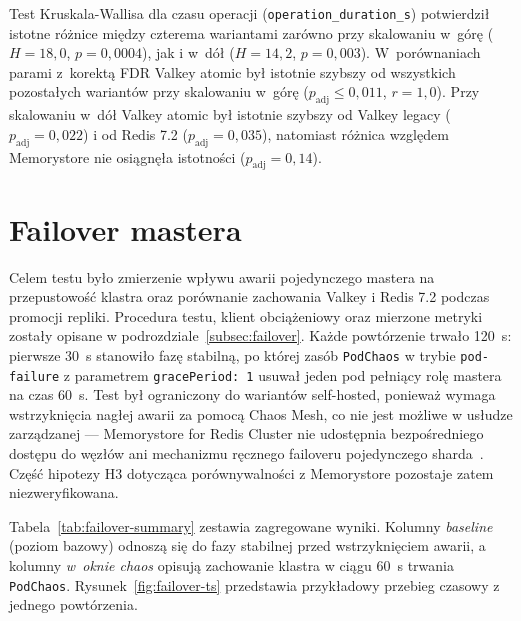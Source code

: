 Test Kruskala-Wallisa dla czasu operacji (\texttt{operation\_duration\_s}) potwierdził istotne różnice między czterema wariantami zarówno przy skalowaniu w~górę ($H = 18{,}0$, $p = 0{,}0004$), jak i w~dół ($H = 14{,}2$, $p = 0{,}003$). W~porównaniach parami z~korektą FDR Valkey atomic był istotnie szybszy od wszystkich pozostałych wariantów przy skalowaniu w~górę ($p_{\mathrm{adj}} \leq 0{,}011$, $r = 1{,}0$). Przy skalowaniu w~dół Valkey atomic był istotnie szybszy od Valkey legacy ($p_{\mathrm{adj}} = 0{,}022$) i od Redis 7.2 ($p_{\mathrm{adj}} = 0{,}035$), natomiast różnica względem Memorystore nie osiągnęła istotności ($p_{\mathrm{adj}} = 0{,}14$).

\section{Failover mastera}

Celem testu było zmierzenie wpływu awarii pojedynczego mastera na przepustowość klastra oraz porównanie zachowania Valkey i Redis 7.2 podczas promocji repliki. Procedura testu, klient obciążeniowy oraz mierzone metryki zostały opisane w podrozdziale~\ref{subsec:failover}. Każde powtórzenie trwało 120~s: pierwsze 30~s stanowiło fazę stabilną, po której zasób \texttt{PodChaos} w trybie \texttt{pod-failure} z parametrem \texttt{gracePeriod: 1} usuwał jeden pod pełniący rolę mastera na czas 60~s. Test był ograniczony do wariantów self-hosted, ponieważ wymaga wstrzyknięcia nagłej awarii za pomocą Chaos Mesh, co nie jest możliwe w usłudze zarządzanej --- Memorystore for Redis Cluster nie udostępnia bezpośredniego dostępu do węzłów ani mechanizmu ręcznego failoveru pojedynczego sharda~\cite{gcpMemorystoreHA}. Część hipotezy H3 dotycząca porównywalności z Memorystore pozostaje zatem niezweryfikowana.

Tabela~\ref{tab:failover-summary} zestawia zagregowane wyniki. Kolumny \textit{baseline} (poziom bazowy) odnoszą się do fazy stabilnej przed wstrzyknięciem awarii, a kolumny \textit{w~oknie chaos} opisują zachowanie klastra w ciągu 60~s trwania \texttt{PodChaos}. Rysunek~\ref{fig:failover-ts} przedstawia przykładowy przebieg czasowy z jednego powtórzenia.

